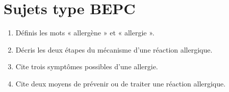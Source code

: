 \section{Sujets type BEPC}

\begin{enumerate}[label=\arabic*)]
\item Définis les mots « allergène » et « allergie ».
\item Décris les deux étapes du mécanisme d'une réaction allergique.
\item Cite trois symptômes possibles d'une allergie.
\item Cite deux moyens de prévenir ou de traiter une réaction allergique.
\end{enumerate}

